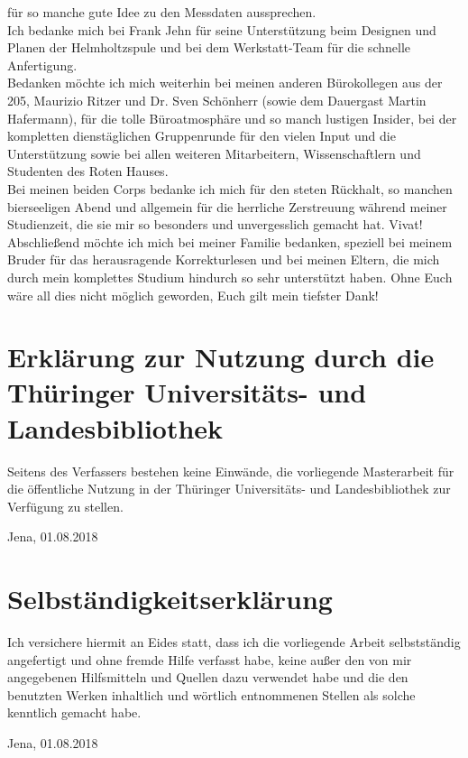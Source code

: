 für so manche gute Idee zu den Messdaten aussprechen.\\ Ich bedanke mich bei
Frank Jehn für seine Unterstützung beim Designen und Planen der Helmholtzspule
und bei dem Werkstatt-Team für die schnelle Anfertigung.\\ Bedanken möchte ich
mich weiterhin bei meinen anderen Bürokollegen aus der 205, Maurizio Ritzer und
Dr. Sven Schönherr (sowie dem Dauergast Martin Hafermann), für die tolle
Büroatmosphäre und so manch lustigen Insider, bei der kompletten dienstäglichen
Gruppenrunde für den vielen Input und die Unterstützung sowie bei allen weiteren
Mitarbeitern, Wissenschaftlern und Studenten des Roten Hauses.\\ Bei meinen
beiden Corps bedanke ich mich für den steten Rückhalt, so manchen bierseeligen
Abend und allgemein für die herrliche Zerstreuung während meiner Studienzeit,
die sie mir so besonders und unvergesslich gemacht hat. Vivat! \\ Abschließend
möchte ich mich bei meiner Familie bedanken, speziell bei meinem Bruder für das
herausragende Korrekturlesen und bei meinen Eltern, die mich durch mein
komplettes Studium hindurch so sehr unterstützt haben. Ohne Euch wäre all dies
nicht möglich geworden, Euch gilt mein tiefster Dank! \newpage
\thispagestyle{empty} \section*{Erklärung zur Nutzung durch die Thüringer
Universitäts- und Landesbibliothek} Seitens des Verfassers bestehen keine
Einwände, die vorliegende Masterarbeit für die öffentliche Nutzung in der
Thüringer Universitäts- und Landesbibliothek zur Verfügung zu stellen.
\vspace*{2cm}

\begin{flushright} Jena, 01.08.2018 \end{flushright} \vspace*{2cm}
\section*{Selbständigkeitserklärung} Ich versichere hiermit an Eides statt, dass
ich die vorliegende Arbeit selbstständig angefertigt und ohne fremde Hilfe
verfasst habe, keine außer den von mir angegebenen Hilfsmitteln und Quellen dazu
verwendet habe und die den benutzten Werken inhaltlich und wörtlich entnommenen
Stellen als solche kenntlich gemacht habe. \vspace*{2cm}

\begin{flushright} Jena, 01.08.2018 \end{flushright}
